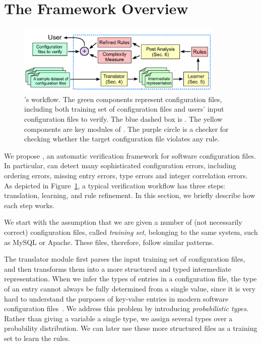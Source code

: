 
\section{The \app Framework Overview}

\begin{figure}[tbp] \centering
\includegraphics[width=0.88\textwidth]{figs/overview}
\caption{\app's workflow. The green components represent configuration 
  files, including both training set of configuration files and users' input
  configuration files to verify.
  The blue dashed box is \app. 
  The yellow components are key modules of \app.
  The purple circle is a checker for checking whether the target
  configuration file violates any rule.}
\label{fig-overview}
\end{figure}

We propose \app, an automatic verification framework for 
software configuration files.
In particular, \app can detect many sophisticated configuration errors, 
including ordering errors, missing entry errors,
type errors and integer correlation errors. 
As depicted in Figure~\ref{fig-overview}, 
a typical \app verification workflow has three steps:
translation, learning, and rule refinement. In this section, we briefly
describe how each step works.

We start with the assumption 
that we are given a number of (not necessarily correct) 
configuration files, called {\em training set}, 
belonging to the same system, such as MySQL or Apache. 
These files, therefore, follow similar patterns.

The translator module first parses the input training  
set of configuration files, and then transforms them into 
a more structured and typed intermediate representation.
When we infer the types of entries in a configuration file, 
the type of an entry cannot always be fully determined from 
a single value, since it is very hard to understand
the purposes of key-value entries in modern
software configuration files~\cite{xu15hey}.
We address this problem 
by introducing {\em probabilistic types}.
Rather than giving a variable a single type, 
we assign several types over a probability distribution. 
We can later use these more structured files
as a training set to learn the rules. 

